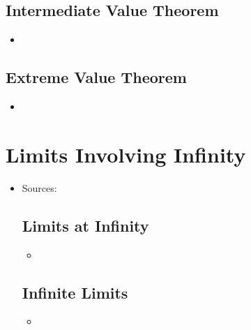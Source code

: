 \begin{itemize}
  \subsection{Intermediate Value Theorem}
  \begin{itemize}
    \item 
  \end{itemize}

  \subsection{Extreme Value Theorem}
  \begin{itemize}
    \item 
  \end{itemize}
  
\end{itemize}

\section{Limits Involving Infinity}
\begin{itemize}
  \item Sources:

  \subsection{Limits at Infinity}
  \begin{itemize}
    \item 
  \end{itemize}

  \subsection{Infinite Limits}
  \begin{itemize}
    \item 
  \end{itemize}
  
  
\end{itemize}







